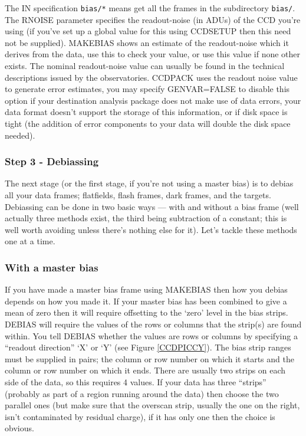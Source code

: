 \documentclass[twoside,11pt]{article}
\newcommand{\htmlref}[2]{#1}
\newcommand{\xlabel}[1]{}
\renewcommand{\_}{\texttt{\symbol{95}}}
\newcommand{\text}[1]{{\small \tt #1}}
\newcommand{\routine}[1]{{\sc #1}}
\newcommand{\xroutine}[1]{\htmlref{{\sc #1}}{#1}}
\begin{document}
The IN specification \text{bias/*} means get all the frames
in the subdirectory \text{bias/}.
The RNOISE parameter specifies the readout-noise (in ADUs) of
the CCD you're using (if you've set up a global value for this using
\xroutine{CCDSETUP} then this need not be supplied).
\routine{MAKEBIAS} shows an estimate of the readout-noise which it derives from
the data, use this to check your value, or use this value if none
other exists.
The nominal readout-noise value can usually be found in the technical
descriptions issued by the observatories.
CCDPACK uses the readout noise value to generate error estimates, you
may specify GENVAR=FALSE to disable this option if your
destination analysis package does not make use of data errors, your
data format doesn't support the storage of this information, or if
disk space is tight (the addition of error components to your data
will double the disk space needed).

\subsubsection{\xlabel{debiassing}Step 3 - Debiassing}

The next stage (or the first stage, if you're not using a master bias)
is to debias all your data frames; flatfields, flash frames, dark
frames, and the targets.
Debiassing can be done in two basic ways --- with and without a bias
frame (well actually three methods exist, the third being subtraction
of a constant; this is well worth avoiding unless there's nothing else
for it).
Let's tackle these methods one at a time.

\subsubsection{With a master bias}

If you have made a master bias frame using \xroutine{MAKEBIAS} then how you
debias depends on how you made it.
If your master bias has been combined to give a mean of zero then it will
require offsetting to the `zero' level in the bias strips.
\xroutine{DEBIAS} will require the values of the rows or columns that the strip(s)
are found within.
You tell \routine{DEBIAS} whether the values are rows or columns by specifying a
``readout direction'' `X' or `Y' (see Figure \ref{CCDPICCY}).
The bias strip ranges must be supplied in pairs; the column or row
number on which it starts and the column or row number on which it ends.
There are usually two strips on each side of the data, so this
requires 4 values.
If your data has three ``strips'' (probably as part of a region
running around the data) then choose the two parallel ones (but make
sure that the overscan strip, usually the one on the right, isn't
contaminated by residual charge), if it has only one then the choice
is obvious.
\end{document}
